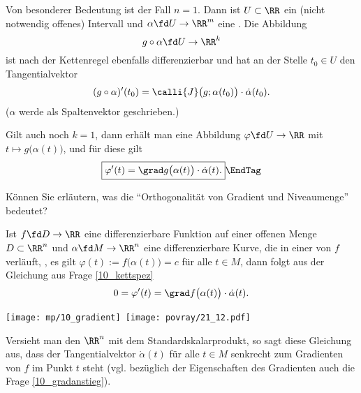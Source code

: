 \begin{antwort}
  Von besonderer Bedeutung ist der Fall $n=1$. 
  Dann ist $U\subset \RR$ ein (nicht notwendig offenes) Intervall 
  und $\alpha \fd U \to \RR^m$ eine 
  . Die Abbildung 
  \[
  g\circ \alpha \fd U \to \RR^k 
  \]
  ist nach der Kettenregel ebenfalls differenzierbar und 
  hat an der Stelle $t_0 \in U$ den Tangentialvektor 
  \[
  ( g\circ \alpha)'(t_0) = 
  \calli{J}\big( g; \alpha(t_0) \big) \cdot \dot{\alpha}(t_0).
  \]
  ($\alpha$ werde als Spaltenvektor geschrieben.)

  Gilt auch noch $k=1$, dann erhält man eine Abbildung 
  $\varphi \fd U \to \RR$ mit 
  $t \mapsto g\big( \alpha(t) \big)$, und für diese gilt 
  \begin{equation}
    \boxed{
      \varphi'(t) = \grad g\big( \alpha(t) \big)\cdot \dot{\alpha}(t).
    }
    \EndTag
  \end{equation} 


\end{antwort}

\begin{frage}\label{10_orthograd}
  Können Sie erläutern, was die 
  "`Orthogonalität von Gradient und Niveaumenge"' bedeutet?
\end{frage}

\begin{antwort}
  Ist $f\fd D \to \RR$ eine differenzierbare 
  Funktion auf einer offenen Menge $D\subset\RR^n$
  und $\alpha \fd M \to \RR^n$ eine 
  differenzierbare Kurve, die in einer  von $f$ verläuft, 
  {\dasheisst}, es gilt 
  $\varphi(t):= f\big( \alpha(t) \big) = c$ für 
  alle $t\in M$, dann folgt aus der Gleichung aus Frage 
  \ref{10_kettspez} 
  \[
  0 = \varphi'(t) = \grad f \big( \alpha(t) \big) \cdot \dot{\alpha}(t).
  \]
  \noindent%

  \begin{center}
    \hbox{\texttt{[image: mp/10\_gradient]}
      \hskip10mm\texttt{[image: povray/21\_12.pdf]}}
  \end{center}

  Versieht man den $\RR^n$ mit dem Standardskalarprodukt, so sagt diese 
  Gleichung aus, dass der Tangentialvektor $\dot{\alpha}(t)$ für alle 
  $t\in M$ senkrecht zum Gradienten von $f$ im Punkt $t$ steht 
  (vgl. bezüglich der Eigenschaften des Gradienten 
  auch die Frage \ref{10_gradanstieg}). 
  \AntEnd
\end{antwort}


